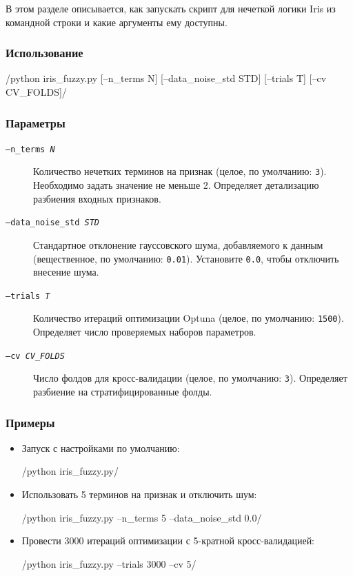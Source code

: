 В этом разделе описывается, как запускать скрипт для нечеткой логики Iris из командной строки и какие аргументы ему доступны.

\subsubsection{Использование}
/python iris_fuzzy.py [--n_terms N] [--data_noise_std STD] [--trials T] [--cv CV_FOLDS]/

\subsubsection{Параметры}
\begin{description}
  \item[\texttt{--n\_terms \textit{N}}]  

    
    Количество нечетких терминов на признак (целое, по умолчанию: \texttt{3}).  
    Необходимо задать значение не меньше 2.  
    Определяет детализацию разбиения входных признаков.

  \item[\texttt{--data\_noise\_std \textit{STD}}]  
    
    
    Стандартное отклонение гауссовского шума, добавляемого к данным (вещественное, по умолчанию: \texttt{0.01}).  
    Установите \texttt{0.0}, чтобы отключить внесение шума.

  \item[\texttt{--trials \textit{T}}]  
    
    
    Количество итераций оптимизации Optuna (целое, по умолчанию: \texttt{1500}).  
    Определяет число проверяемых наборов параметров.

  \item[\texttt{--cv \textit{CV\_FOLDS}}]  
    
    
    Число фолдов для кросс-валидации (целое, по умолчанию: \texttt{3}).  
    Определяет разбиение на стратифицированные фолды.
\end{description}

\subsubsection{Примеры}
\begin{itemize}
  \item Запуск с настройками по умолчанию:
    
    /python iris_fuzzy.py/

  \item Использовать 5 терминов на признак и отключить шум:
    
    /python iris_fuzzy.py --n_terms 5 --data_noise_std 0.0/

  \item Провести 3000 итераций оптимизации с 5-кратной кросс-валидацией:
    
    /python iris_fuzzy.py --trials 3000 --cv 5/
\end{itemize}

